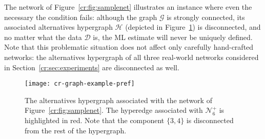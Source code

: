 The network of Figure~\ref{cr:fig:samplenet} illustrates an instance where even the necessary the condition fails:
although the graph $\mathcal{G}$ is strongly connected, its associated alternatives hypergraph $\mathcal{H}$ (depicted in Figure~\ref{cr:fig:samplehyp}) is disconnected, and no matter what the data $\mathcal{D}$ is, the ML estimate will never be uniquely defined.
Note that this problematic situation does not affect only carefully hand-crafted networks: the alternatives hypergraph of all three real-world networks considered in Section~\ref{cr:sec:experiments} are disconnected as well.

\begin{figure}
  \centering
  \texttt{[image: cr-graph-example-pref]}
  \caption{The alternatives hypergraph associated with the network of Figure~\ref{cr:fig:samplenet}.
The hyperedge associated with $\mathcal{N}^+_6$ is highlighted in red.
Note that the component $\{3, 4\}$ is disconnected from the rest of the hypergraph.}
  \label{cr:fig:samplehyp}
\end{figure}
